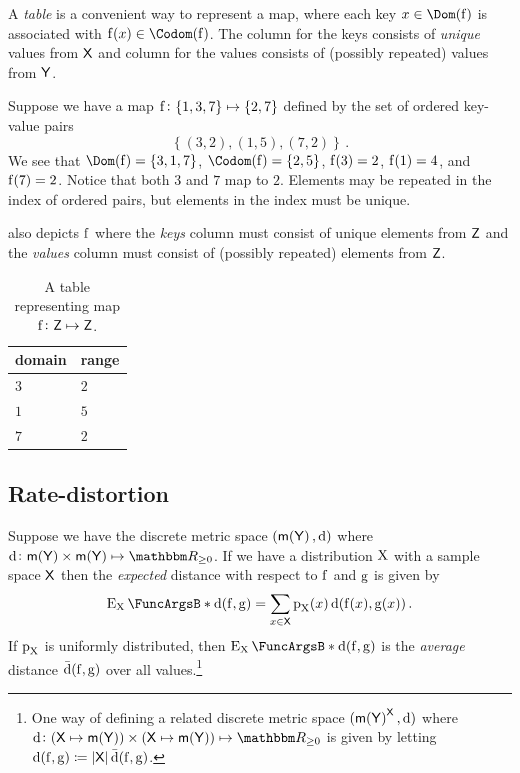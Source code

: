 \documentclass[11pt,final,hidelinks]{article}
\begin{document}
A \emph{table} is a convenient way to represent a map, where each key $x \in \Dom(\Fun{f})$ is associated with $\Fun{f}(x) \in \Codom(\Fun{f})$. The column for the keys consists of \emph{unique} values from $\Set{X}$ and column for the values consists of (possibly repeated) values from $\Set{Y}$.
\begin{example}
	Suppose we have a map $\Fun{f} \colon \{1,3,7\} \mapsto \{2,7\}$ defined by the set of ordered key-value pairs
	\begin{equation}
	\left\{(3,2),(1,5),(7,2)\right\}\,.
	\end{equation}
	We see that $\Dom(\Fun{f}) = \{3,1,7\}$, $\Codom(\Fun{f}) = \{2,5\}$, $\Fun{f}(3) = 2$, $\Fun{f}(1) = 4$, and $\Fun{f}(7) = 2$. Notice that both $3$ and $7$ map to $2$. Elements may be repeated in the  index of ordered pairs, but elements in the  index must be unique.
	
	 also depicts $\Fun{f}$ where the \emph{keys} column must consist of unique elements from $\Set{Z}$ and the \emph{values} column must consist of (possibly repeated) elements from $\Set{Z}$.
	\begin{table}[h]
		\centering
		\caption{A table representing map $\Fun{f} \colon \Set{Z} \mapsto \Set{Z}$.}
		\label{tbl:tabfunc}
		\begin{tabular}{@{} l l @{}} 
			\toprule
			domain & range\\
			\midrule
			$3$ & $2$\\
			$1$ & $5$\\
			$7$ & $2$\\
			\bottomrule
		\end{tabular}
	\end{table}
\end{example}

\subsection{Rate-distortion}
\label{sec:error}
Suppose we have the discrete metric space $(\Maybe{\Set{Y}}, \Fun{d})$ where $\Fun{d} \colon \Maybe{\Set{Y}} \times \Maybe{\Set{Y}} \mapsto \RealSet_{\geq 0}$.
If we have a distribution $\mathrm{X}$ with a sample space $\Set{X}$ then the \emph{expected} distance with respect to $\Fun{f}$ and $\Fun{g}$ is given by
\begin{equation}
\Expect{\Fun{d}(\Fun{f},\Fun{g})}[\RV{X}] = \sum_{x \in \Set{X}} \Fun{p}_{\RV{X}}(x) \Fun{d}(\Fun{f}(x),\Fun{g}(x))\,.
\end{equation}
If $\Fun{p}_{\RV{X}}$ is uniformly distributed, then $\Expect{\Fun{d}(\Fun{f},\Fun{g})}[\RV{X}]$ is the \emph{average} distance $\Fun{\bar{d}}(\Fun{f},\Fun{g})$ over all values.\footnote{One way of defining a related discrete metric space $(\Maybe{\Set{Y}}^{\Set{X}}, \Fun{d})$ where $\Fun{d} \colon (\Set{X} \mapsto \Maybe{\Set{Y}}) \times (\Set{X} \mapsto \Maybe{\Set{Y}}) \mapsto \RealSet_{\geq 0}$ is given by letting $\Fun{d}(\Fun{f},\Fun{g}) \coloneqq \Card{\Set{X}} \Fun{\bar{d}}(\Fun{f},\Fun{g})$.}
\end{document}
